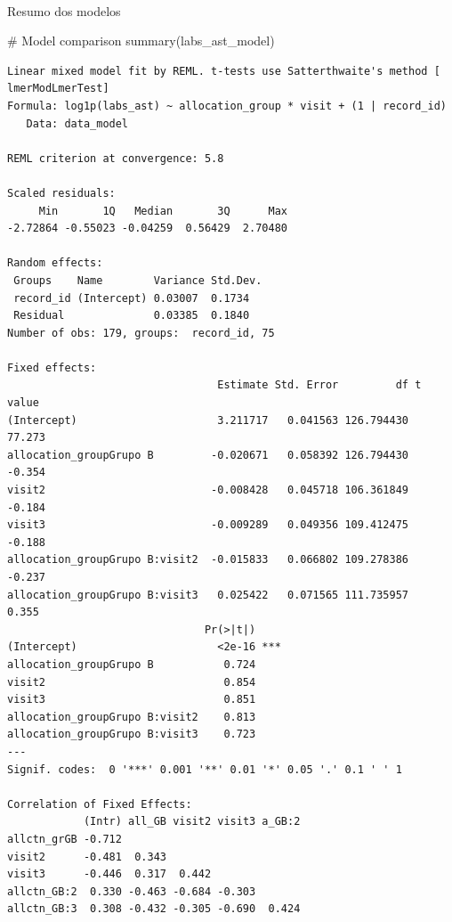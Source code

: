 \documentclass[
  letterpaper,
  DIV=11,
  numbers=noendperiod]{scrartcl}
\makeatletter
\let\oldparagraph\paragraph
\renewcommand{\paragraph}{
    \@ifstar
      \xxxParagraphStar
      \xxxParagraphNoStar
  }
\newcommand{\xxxParagraphStar}[1]{\oldparagraph*{#1}\mbox{}}
\newcommand{\xxxParagraphNoStar}[1]{\oldparagraph{#1}\mbox{}}
\newenvironment{Shaded}{\begin{snugshade}}{\end{snugshade}}
\newcommand{\CommentTok}[1]{\textcolor[rgb]{0.37,0.37,0.37}{#1}}
\newcommand{\FunctionTok}[1]{\textcolor[rgb]{0.28,0.35,0.67}{#1}}
\newcommand{\NormalTok}[1]{\textcolor[rgb]{0.00,0.23,0.31}{#1}}
\makeatother
\begin{document}
\paragraph{Resumo dos modelos}\label{resumo-dos-modelos}

\begin{Shaded}
\begin{Highlighting}[]
\CommentTok{\# Model comparison}
\FunctionTok{summary}\NormalTok{(labs\_ast\_model)}
\end{Highlighting}
\end{Shaded}

\begin{verbatim}
Linear mixed model fit by REML. t-tests use Satterthwaite's method [
lmerModLmerTest]
Formula: log1p(labs_ast) ~ allocation_group * visit + (1 | record_id)
   Data: data_model

REML criterion at convergence: 5.8

Scaled residuals: 
     Min       1Q   Median       3Q      Max 
-2.72864 -0.55023 -0.04259  0.56429  2.70480 

Random effects:
 Groups    Name        Variance Std.Dev.
 record_id (Intercept) 0.03007  0.1734  
 Residual              0.03385  0.1840  
Number of obs: 179, groups:  record_id, 75

Fixed effects:
                                 Estimate Std. Error         df t value
(Intercept)                      3.211717   0.041563 126.794430  77.273
allocation_groupGrupo B         -0.020671   0.058392 126.794430  -0.354
visit2                          -0.008428   0.045718 106.361849  -0.184
visit3                          -0.009289   0.049356 109.412475  -0.188
allocation_groupGrupo B:visit2  -0.015833   0.066802 109.278386  -0.237
allocation_groupGrupo B:visit3   0.025422   0.071565 111.735957   0.355
                               Pr(>|t|)    
(Intercept)                      <2e-16 ***
allocation_groupGrupo B           0.724    
visit2                            0.854    
visit3                            0.851    
allocation_groupGrupo B:visit2    0.813    
allocation_groupGrupo B:visit3    0.723    
---
Signif. codes:  0 '***' 0.001 '**' 0.01 '*' 0.05 '.' 0.1 ' ' 1

Correlation of Fixed Effects:
            (Intr) all_GB visit2 visit3 a_GB:2
allctn_grGB -0.712                            
visit2      -0.481  0.343                     
visit3      -0.446  0.317  0.442              
allctn_GB:2  0.330 -0.463 -0.684 -0.303       
allctn_GB:3  0.308 -0.432 -0.305 -0.690  0.424
\end{verbatim}
\end{document}
